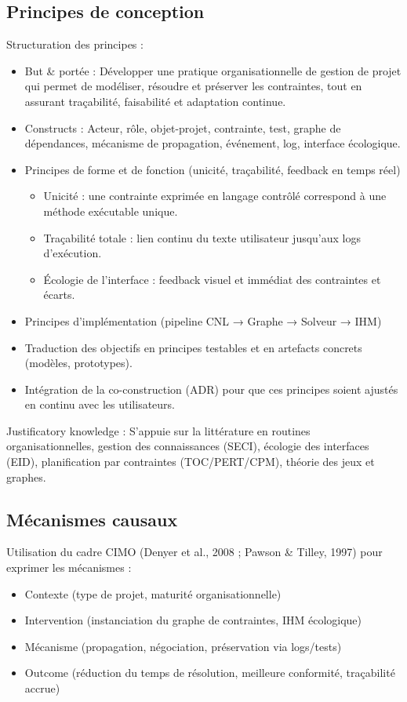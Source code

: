 \documentclass[a4paper,12pt]{article}
\begin{document}
\subsection{Principes de conception}
\label{sec:org9d70ee8}
Structuration des principes \autocite[\& Jones (2007)]{Gregor} :
\begin{itemize}
\item But \& portée : Développer une pratique organisationnelle de gestion de projet qui permet de modéliser, résoudre et préserver les contraintes, tout en assurant traçabilité, faisabilité et adaptation continue.
\item Constructs : Acteur, rôle, objet-projet, contrainte, test, graphe de dépendances, mécanisme de propagation, événement, log, interface écologique.
\item Principes de forme et de fonction (unicité, traçabilité, feedback en temps réel)
\begin{itemize}
\item Unicité : une contrainte exprimée en langage contrôlé correspond à une méthode exécutable unique.
\item Traçabilité totale : lien continu du texte utilisateur jusqu’aux logs d’exécution.
\item Écologie de l’interface : feedback visuel et immédiat des contraintes et écarts.
\end{itemize}
\item Principes d’implémentation (pipeline CNL → Graphe → Solveur → IHM)
\item Traduction des objectifs en principes testables et en artefacts concrets (modèles, prototypes).
\item Intégration de la co-construction (ADR) pour que ces principes soient ajustés en continu avec les utilisateurs.
\end{itemize}

Justificatory knowledge : S’appuie sur la littérature en routines organisationnelles, gestion des connaissances (SECI), écologie des interfaces (EID), planification par contraintes (TOC/PERT/CPM), théorie des jeux et graphes.
\subsection{Mécanismes causaux}
\label{sec:orga7659c7}
Utilisation du cadre CIMO (Denyer et al., 2008 ; Pawson \& Tilley, 1997) pour exprimer les mécanismes :
\begin{itemize}
\item Contexte (type de projet, maturité organisationnelle)
\item Intervention (instanciation du graphe de contraintes, IHM écologique)
\item Mécanisme (propagation, négociation, préservation via logs/tests)
\item Outcome (réduction du temps de résolution, meilleure conformité, traçabilité accrue)
\end{itemize}
\end{document}
